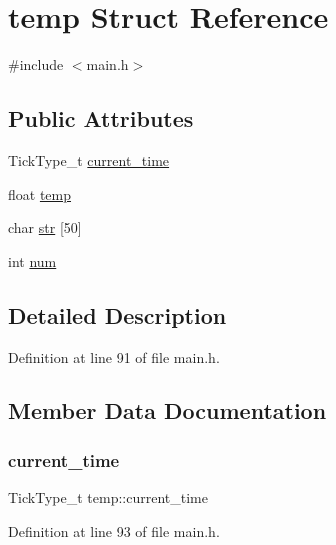 \hypertarget{structtemp}{}\section{temp Struct Reference}
\label{structtemp}


{\ttfamily \#include $<$main.\+h$>$}

\subsection*{Public Attributes}
\begin{DoxyCompactItemize}
\item 
Tick\+Type\+\_\+t \hyperlink{structtemp_a083aa7339b28a78a71bfaef491294393}{current\+\_\+time}
\item 
float \hyperlink{structtemp_ab73df077c620529b5de4a6bdaf187113}{temp}
\item 
char \hyperlink{structtemp_af9b2099e55b58c3aabcde6e7dd077dae}{str} \mbox{[}50\mbox{]}
\item 
int \hyperlink{structtemp_ae43f5bf5870d8402a93778504a05f50a}{num}
\end{DoxyCompactItemize}


\subsection{Detailed Description}


Definition at line 91 of file main.\+h.



\subsection{Member Data Documentation}
\mbox{\label{structtemp_a083aa7339b28a78a71bfaef491294393}} 
\subsubsection{\texorpdfstring{current\+\_\+time}{current\_time}}
{\footnotesize\ttfamily Tick\+Type\+\_\+t temp\+::current\+\_\+time}



Definition at line 93 of file main.\+h.

\mbox{\label{structtemp_ae43f5bf5870d8402a93778504a05f50a}} 
